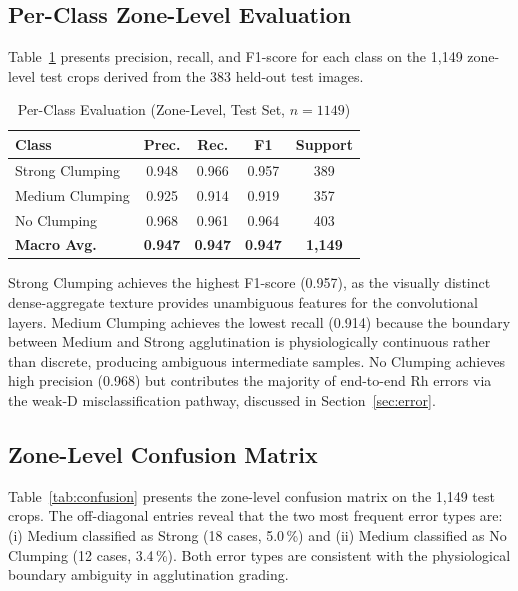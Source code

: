\documentclass[journal]{IEEEtran}
\begin{document}
\subsection{Per-Class Zone-Level Evaluation}

Table~\ref{tab:perclass} presents precision, recall, and F1-score
for each class on the 1,149 zone-level test crops derived from the
383 held-out test images.

\begin{table}[htbp]
  \caption{Per-Class Evaluation (Zone-Level, Test Set, $n{=}1149$)}
  \label{tab:perclass}
  \centering
  \renewcommand{\arraystretch}{1.1}
  \begin{tabular}{lcccc}
    \toprule
    \textbf{Class} & \textbf{Prec.} & \textbf{Rec.} &
    \textbf{F1} & \textbf{Support} \\
    \midrule
    Strong Clumping & 0.948 & 0.966 & 0.957 & 389 \\
    Medium Clumping & 0.925 & 0.914 & 0.919 & 357 \\
    No Clumping     & 0.968 & 0.961 & 0.964 & 403 \\
    \midrule
    \textbf{Macro Avg.} & \textbf{0.947} & \textbf{0.947} &
    \textbf{0.947} & \textbf{1,149} \\
    \bottomrule
  \end{tabular}
\end{table}

Strong Clumping achieves the highest F1-score (0.957), as the
visually distinct dense-aggregate texture provides unambiguous
features for the convolutional layers.
Medium Clumping achieves the lowest recall (0.914) because the
boundary between Medium and Strong agglutination is physiologically
continuous rather than discrete, producing ambiguous intermediate
samples.
No Clumping achieves high precision (0.968) but contributes the
majority of end-to-end Rh errors via the weak-D misclassification
pathway, discussed in Section~\ref{sec:error}.

\subsection{Zone-Level Confusion Matrix}

Table~\ref{tab:confusion} presents the zone-level confusion matrix
on the 1,149 test crops.
The off-diagonal entries reveal that the two most frequent
error types are: (i) Medium classified as Strong (18 cases, 5.0\,\%)
and (ii) Medium classified as No Clumping (12 cases, 3.4\,\%).
Both error types are consistent with the physiological boundary
ambiguity in agglutination grading.
\end{document}
